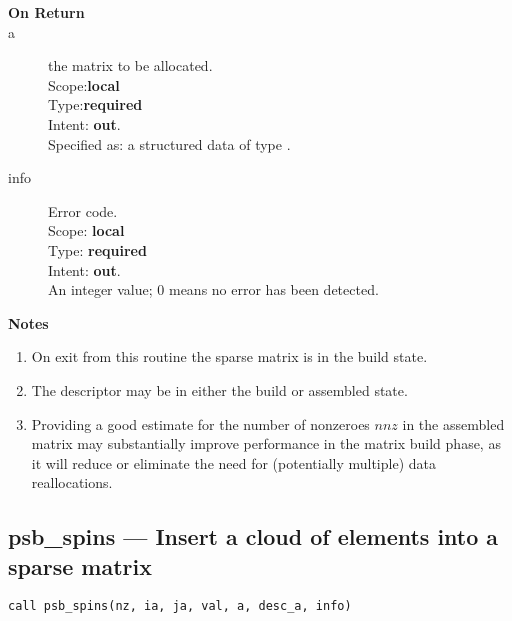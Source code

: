 \begin{description}
\item[\bf On Return]
\item[a] the matrix to be allocated.\\
Scope:{\bf local}\\
Type:{\bf required}\\
Intent: {\bf out}.\\
Specified as: a structured data of type \spdata.
\item[info] Error code.\\
Scope: {\bf local} \\
Type: {\bf required} \\
Intent: {\bf out}.\\
An integer value; 0 means no error has been detected. 
\end{description}
{\par\noindent\large\bfseries Notes}
\begin{enumerate}
\item On exit from this routine the sparse matrix  is in the build
  state.
\item The descriptor may be in either the build or assembled state.
\item Providing a good estimate for the number of nonzeroes $nnz$ in
  the assembled matrix may substantially improve performance in the
  matrix build phase, as it will reduce or eliminate the need for
  (potentially multiple) data reallocations. 
\end{enumerate}



%
%
\clearpage\subsection*{psb\_spins --- Insert a cloud of elements into a sparse
  matrix}

\begin{verbatim}
call psb_spins(nz, ia, ja, val, a, desc_a, info)
\end{verbatim}

